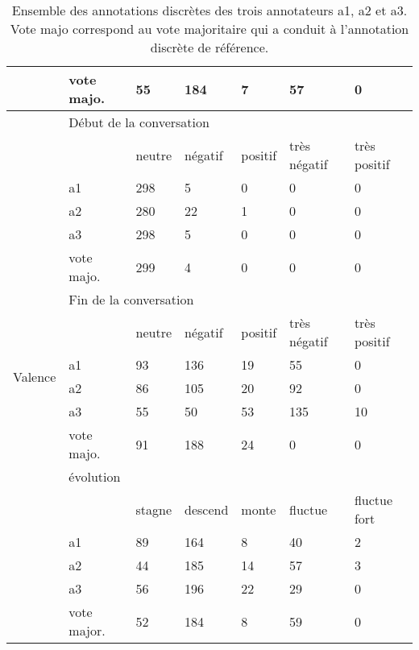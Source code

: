 \begin{table}
\begin{tabular}{|l|l|l|l|l|l|l|}
      & vote majo. & 55     & 184     & 7         & 57           & 0                 \\ \hline \hline
\multirow{18}{*}{Valence}             & \multicolumn{6}{l|}{Début de la conversation}                                      \\ \cline{2-7}
      &                  & neutre & négatif & positif   & très négatif & très positif      \\ \cline{2-7}
      & a1               & 298    & 5       & 0         & 0            & 0                 \\ \cline{2-7}
      & a2               & 280    & 22      & 1         & 0            & 0                 \\ \cline{2-7}
      & a3               & 298    & 5       & 0         & 0            & 0                 \\ \cline{2-7}
      & vote majo. & 299    & 4       & 0         & 0            & 0                 \\ \cline{2-7}
      & \multicolumn{6}{l|}{Fin de la conversation}                                        \\ \cline{2-7}
      &                  & neutre & négatif & positif   & très négatif & très positif      \\ \cline{2-7}
      & a1               & 93     & 136     & 19        & 55           & 0                 \\ \cline{2-7}
      & a2               & 86     & 105     & 20        & 92           & 0                 \\ \cline{2-7}
      & a3               & 55     & 50      & 53        & 135          & 10                \\ \cline{2-7}
      & vote majo. & 91     & 188     & 24        & 0            & 0                 \\ \cline{2-7}
      & \multicolumn{6}{l|}{évolution}                                                     \\ \cline{2-7}
      &                  & stagne & descend & monte     & fluctue      & fluctue fort \\ \cline{2-7}
      & a1               & 89     & 164     & 8         & 40           & 2                 \\ \cline{2-7}
      & a2               & 44     & 185     & 14        & 57           & 3                 \\ \cline{2-7}
      & a3               & 56     & 196     & 22        & 29           & 0                 \\ \cline{2-7}
      & vote major. & 52     & 184     & 8         & 59           & 0                 \\ \hline
\end{tabular}
\label{tab:statistiqueAnnotation}
\caption{Ensemble des annotations discrètes des trois annotateurs a1, a2 et a3. Vote majo correspond au vote majoritaire qui a conduit à l'annotation discrète de référence.}
\end{table}
